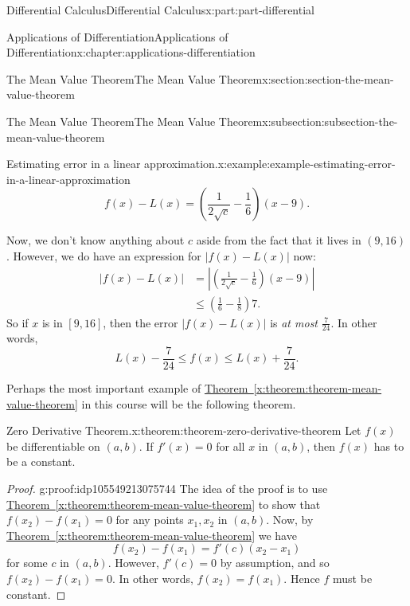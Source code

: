 \documentclass[twoside,10pt,]{book}
\newcommand{\xreffont}{\relax}
\numberwithin{equation}{part}
\begin{document}
\begin{partptx}{Differential Calculus}{}{Differential Calculus}{}{}{x:part:part-differential}
\begin{chapterptx}{Applications of Differentiation}{}{Applications of Differentiation}{}{}{x:chapter:applications-differentiation}
\begin{sectionptx}{The Mean Value Theorem}{}{The Mean Value Theorem}{}{}{x:section:section-the-mean-value-theorem}
\begin{subsectionptx}{The Mean Value Theorem}{}{The Mean Value Theorem}{}{}{x:subsection:subsection-the-mean-value-theorem}
\begin{example}{Estimating error in a linear approximation.}{x:example:example-estimating-error-in-a-linear-approximation}
\begin{equation*}
f(x) - L(x) = \left(\frac{1}{2\sqrt{c}} - \frac{1}{6}\right)(x-9).
\end{equation*}
%
\par
Now, we don't know anything about \(c\) aside from the fact that it lives in \((9,16)\). However, we do have an expression for \(|f(x) - L(x)|\) now:%
\begin{align*}
|f(x) - L(x)| & = \left|\left(\frac{1}{2\sqrt{c}} - \frac{1}{6}\right)(x-9)\right|\\
& \leq \left(\frac{1}{6} - \frac{1}{8}\right)7. 
\end{align*}
So if \(x\) is in \([9,16]\), then the error \(|f(x) - L(x)|\) is \emph{at most} \(\frac{7}{24}\). In other words,%
\begin{equation*}
L(x) - \frac{7}{24} \leq f(x) \leq L(x) + \frac{7}{24}.
\end{equation*}
%
\end{example}
Perhaps the most important example of \hyperref[x:theorem:theorem-mean-value-theorem]{Theorem~{\xreffont\ref{x:theorem:theorem-mean-value-theorem}}} in this course will be the following theorem.%
\begin{theorem}{Zero Derivative Theorem.}{}{x:theorem:theorem-zero-derivative-theorem}%
Let \(f(x)\) be differentiable on \((a,b)\). If \(f'(x) = 0\) for all \(x\) in \((a,b)\), then \(f(x)\) has to be a constant.%
\end{theorem}
\begin{proof}{}{g:proof:idp105549213075744}
The idea of the proof is to use \hyperref[x:theorem:theorem-mean-value-theorem]{Theorem~{\xreffont\ref{x:theorem:theorem-mean-value-theorem}}} to show that \(f(x_{2}) - f(x_{1}) = 0\) for any points \(x_{1},x_{2}\) in \((a,b)\). Now, by \hyperref[x:theorem:theorem-mean-value-theorem]{Theorem~{\xreffont\ref{x:theorem:theorem-mean-value-theorem}}} we have%
\begin{equation*}
f(x_{2}) - f(x_{1}) = f'(c)(x_{2}-x_{1})
\end{equation*}
for some \(c\) in \((a,b)\). However, \(f'(c) = 0\) by assumption, and so \(f(x_{2}) - f(x_{1}) = 0\). In other words, \(f(x_{2}) = f(x_{1})\). Hence \(f\) must be constant.%
\end{proof}
\end{subsectionptx}
\end{sectionptx}
%
%
\typeout{************************************************}
\typeout{************************************************}

\end{chapterptx}
\end{partptx}
\end{document}
